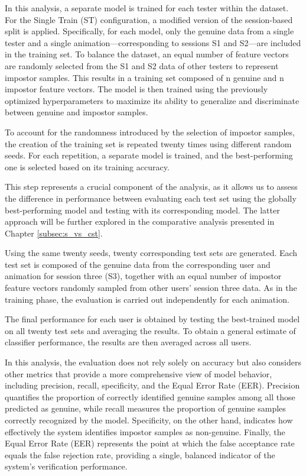 \documentclass{article}
\begin{document}
In this analysis, a separate model is trained for each tester within the dataset.
For the Single Train (ST) configuration, a modified version of the session-based split is applied.
Specifically, for each model, only the genuine data from a single tester and a single animation—corresponding to sessions S1 and S2—are included in the training set.
To balance the dataset, an equal number of feature vectors are randomly selected from the S1 and S2 data of other testers to represent impostor samples.
This results in a training set composed of n genuine and n impostor feature vectors.
The model is then trained using the previously optimized hyperparameters to maximize its ability to generalize and discriminate between genuine and impostor samples.

To account for the randomness introduced by the selection of impostor samples, the creation of the training set is repeated twenty times using different random seeds.
For each repetition, a separate model is trained, and the best-performing one is selected based on its training accuracy.

This step represents a crucial component of the analysis, as it allows us to assess the difference in performance between evaluating each test set using the globally best-performing model and testing with its corresponding model.
The latter approach will be further explored in the comparative analysis presented in Chapter \ref{subsec:s_vs_cst}.

Using the same twenty seeds, twenty corresponding test sets are generated.
Each test set is composed of the genuine data from the corresponding user and animation for session three (S3), together with an equal number of impostor feature vectors randomly sampled from other users’ session three data.
As in the training phase, the evaluation is carried out independently for each animation.

The final performance for each user is obtained by testing the best-trained model on all twenty test sets and averaging the results.
To obtain a general estimate of classifier performance, the results are then averaged across all users.

In this analysis, the evaluation does not rely solely on accuracy but also considers other metrics that provide a more comprehensive view of model behavior, including precision, recall, specificity, and the Equal Error Rate (EER).
Precision quantifies the proportion of correctly identified genuine samples among all those predicted as genuine, while recall measures the proportion of genuine samples correctly recognized by the model.
Specificity, on the other hand, indicates how effectively the system identifies impostor samples as non-genuine.
Finally, the Equal Error Rate (EER) represents the point at which the false acceptance rate equals the false rejection rate, providing a single, balanced indicator of the system's verification performance.
\end{document}
